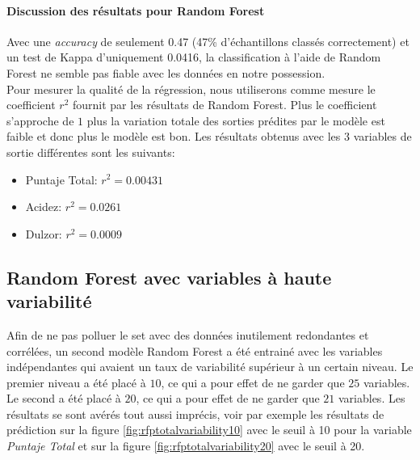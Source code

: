 \newpage


\paragraph{Discussion des résultats pour Random Forest}
Avec une \textit{accuracy} de seulement 0.47  (47\% d'échantillons classés correctement) et un test de Kappa d'uniquement 0.0416, la classification à l'aide de Random Forest ne semble pas fiable avec les données en notre possession. \\

\noindent Pour mesurer la qualité de la régression, nous utiliserons comme mesure le coefficient $r^2$ fournit par les résultats de Random Forest. Plus le coefficient s'approche de $1$ plus la variation totale des sorties prédites par le modèle est faible et donc plus le modèle est bon. Les résultats obtenus avec les 3 variables de sortie différentes sont les suivants: \\


\begin{itemize}
	\item Puntaje Total: $r^2 = 0.00431$
	\item Acidez: $r^2 = 0.0261$
	\item Dulzor: $r^2 = 0.0009$
\end{itemize} 












\subsection{Random Forest avec variables à haute variabilité}
Afin de ne pas polluer le set avec des données inutilement redondantes et corrélées, un second modèle Random Forest a été entrainé avec les variables indépendantes qui avaient un taux de variabilité supérieur à un certain niveau. Le premier niveau a été placé à $10$, ce qui a pour effet de ne garder que $25$ variables. Le second a été placé à $20$, ce qui a pour effet de ne garder que $21$ variables. Les résultats se sont avérés tout aussi imprécis, voir par exemple les résultats de prédiction sur la figure \ref{fig:rfptotalvariability10} avec le seuil à 10 pour la variable \textit{Puntaje Total} et sur la figure \ref{fig:rfptotalvariability20} avec le seuil à 20.

